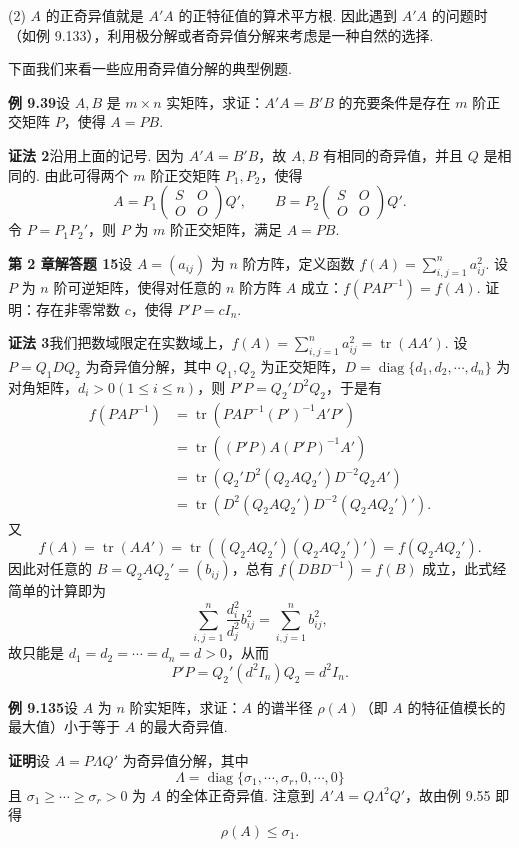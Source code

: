 \documentclass[UTF8, 12pt, fontset=fandol, oneside]{ctexart}
\begin{document}
(2) $A$ 的正奇异值就是 $A'A$ 的正特征值的算术平方根. 因此遇到 $A'A$ 的问题时（如例 9.133），利用极分解或者奇异值分解来考虑是一种自然的选择.

下面我们来看一些应用奇异值分解的典型例题.

\noindent\textbf{例 9.39}\quad 设 $A,B$ 是 $m\times n$ 实矩阵，求证：$A'A=B'B$ 的充要条件是存在 $m$ 阶正交矩阵 $P$，使得 $A=PB$.

\noindent\textbf{证法 2}\quad 沿用上面的记号. 因为 $A'A=B'B$，故 $A,B$ 有相同的奇异值，并且 $Q$ 是相同的. 由此可得两个 $m$ 阶正交矩阵 $P_1,P_2$，使得
\[
A=P_1\begin{pmatrix}
S&O\\
O&O
\end{pmatrix}Q',\qquad
B=P_2\begin{pmatrix}
S&O\\
O&O
\end{pmatrix}Q'.
\]
令 $P=P_1P_2'$，则 $P$ 为 $m$ 阶正交矩阵，满足 $A=PB$.

\noindent\textbf{第 2 章解答题 15}\quad 设 $A=(a_{ij})$ 为 $n$ 阶方阵，定义函数 $f(A)=\sum_{i,j=1}^n a_{ij}^2$. 设 $P$ 为 $n$ 阶可逆矩阵，使得对任意的 $n$ 阶方阵 $A$ 成立：$f(PAP^{-1})=f(A)$. 证明：存在非零常数 $c$，使得 $P'P=cI_n$.

\noindent\textbf{证法 3}\quad 我们把数域限定在实数域上，$f(A)=\sum_{i,j=1}^n a_{ij}^2=\operatorname{tr}(AA')$. 设 $P=Q_1DQ_2$ 为奇异值分解，其中 $Q_1,Q_2$ 为正交矩阵，$D=\operatorname{diag}\{d_1,d_2,\cdots,d_n\}$ 为对角矩阵，$d_i>0(1\le i\le n)$，则 $P'P=Q_2'D^2Q_2$，于是有
\[
\begin{aligned}
f(PAP^{-1})
&=\operatorname{tr}(PAP^{-1}(P')^{-1}A'P')\\
&=\operatorname{tr}((P'P)A(P'P)^{-1}A')\\
&=\operatorname{tr}(Q_2'D^2(Q_2AQ_2')D^{-2}Q_2A')\\
&=\operatorname{tr}(D^2(Q_2AQ_2')D^{-2}(Q_2AQ_2')').
\end{aligned}
\]
又
\[
f(A)=\operatorname{tr}(AA')=\operatorname{tr}((Q_2AQ_2')(Q_2AQ_2')')=f(Q_2AQ_2').
\]
因此对任意的 $B=Q_2AQ_2'=(b_{ij})$，总有 $f(DBD^{-1})=f(B)$ 成立，此式经简单的计算即为
\[
\sum_{i,j=1}^n\frac{d_i^2}{d_j^2}b_{ij}^2=\sum_{i,j=1}^n b_{ij}^2,
\]
故只能是 $d_1=d_2=\cdots=d_n=d>0$，从而
\[
P'P=Q_2'(d^2I_n)Q_2=d^2I_n.
\]

\noindent\textbf{例 9.135}\quad 设 $A$ 为 $n$ 阶实矩阵，求证：$A$ 的谱半径 $\rho(A)$（即 $A$ 的特征值模长的最大值）小于等于 $A$ 的最大奇异值.

\noindent\textbf{证明}\quad 设 $A=P\Lambda Q'$ 为奇异值分解，其中
\[
\Lambda=\operatorname{diag}\{\sigma_1,\cdots,\sigma_r,0,\cdots,0\}
\]
且 $\sigma_1\ge\cdots\ge\sigma_r>0$ 为 $A$ 的全体正奇异值. 注意到 $A'A=Q\Lambda^2Q'$，故由例 9.55 即得
\[
\rho(A)\le\sigma_1.
\]
\end{document}
